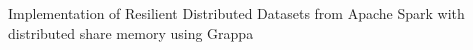Implementation of Resilient Distributed Datasets from Apache Spark with distributed share memory using Grappa 